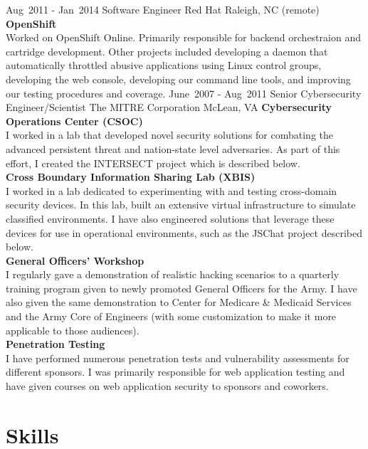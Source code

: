 \documentclass[11pt,letterpaper,sans]{moderncv}
\begin{document}
\cventry
{
\mbox{Aug 2011}
-
\mbox{Jan 2014}
}
{Software Engineer}
{Red Hat}
{Raleigh, NC (remote)}
{}
{
\textbf{OpenShift} \\
Worked on OpenShift Online.
Primarily responsible for backend orchestraion and cartridge development.
Other projects included
developing a daemon that automatically throttled abusive applications using Linux control groups,
developing the web console,
developing our command line tools,
and improving our testing procedures and coverage.
}
\cventry
{
\mbox{June 2007}
-
\mbox{Aug 2011}
}
{Senior Cybersecurity Engineer/Scientist}
{The MITRE Corporation}
{McLean, VA}
{}
{
\textbf{Cybersecurity Operations Center (CSOC)} \\
I worked in a lab that developed novel security solutions for combating the advanced persistent threat and nation-state level adversaries.
As part of this effort, I created the INTERSECT project which is described below.
\\
\textbf{Cross Boundary Information Sharing Lab (XBIS)} \\
I worked in a lab dedicated to experimenting with and testing cross-domain security devices.
In this lab, built an extensive virtual infrastructure to simulate classified environments.
I have also engineered solutions that leverage these devices for use in operational environments, such as the JSChat project described below.
\\
\textbf{General Officers' Workshop} \\
I regularly gave a demonstration of realistic hacking scenarios to a quarterly training program given to newly promoted General Officers for the Army.
I have also given the same demonstration to Center for Medicare \& Medicaid Services and the Army Core of Engineers (with some customization to make it more applicable to those audiences).
\\
\textbf{Penetration Testing} \\
I have performed numerous penetration tests and vulnerability assessments for different sponsors.
I was primarily responsible for web application testing and have given courses on web application security to sponsors and coworkers.
}

\section{Skills}
\end{document}
